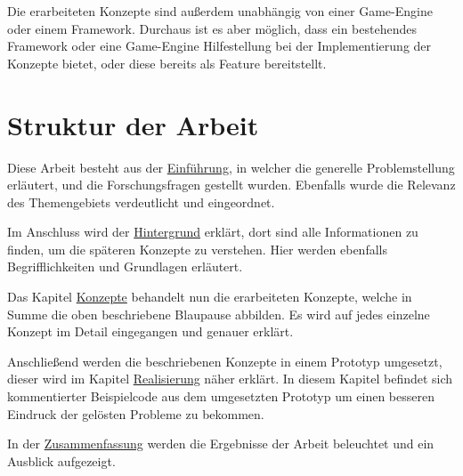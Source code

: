 Die erarbeiteten Konzepte sind außerdem unabhängig von einer Game-Engine oder einem Framework. Durchaus ist es aber möglich, dass ein bestehendes Framework oder eine Game-Engine Hilfestellung bei der Implementierung der Konzepte bietet, oder diese bereits als Feature bereitstellt.

\section{Struktur der Arbeit}

Diese Arbeit besteht aus der \hyperref[sec:einfuehrung]{Einführung}, in welcher die generelle Problemstellung erläutert, und die Forschungsfragen gestellt wurden. Ebenfalls wurde die Relevanz des Themengebiets verdeutlicht und eingeordnet.

Im Anschluss wird der  \hyperref[sec:hintergrund]{Hintergrund} erklärt, dort sind alle Informationen zu finden, um die späteren Konzepte zu verstehen. Hier werden ebenfalls Begrifflichkeiten und Grundlagen erläutert.

Das Kapitel \hyperref[sec:konzepte]{Konzepte} behandelt nun die erarbeiteten Konzepte, welche in Summe die oben beschriebene Blaupause abbilden. Es wird auf jedes einzelne Konzept im Detail eingegangen und genauer erklärt. 
 
Anschließend werden die beschriebenen Konzepte in einem Prototyp umgesetzt, dieser wird im Kapitel \hyperref[sec:realisierung]{Realisierung} näher erklärt. In diesem Kapitel befindet sich kommentierter Beispielcode aus dem umgesetzten Prototyp um einen besseren Eindruck der gelösten Probleme zu bekommen.

In der \hyperref[sec:zusammenfassung]{Zusammenfassung} werden die Ergebnisse der Arbeit beleuchtet und ein Ausblick aufgezeigt.
